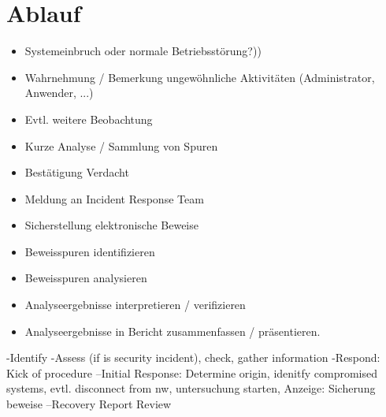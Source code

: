 \section{Ablauf}
\begin{itemize}
  \item Systemeinbruch oder normale Betriebsstörung?))
  \item Wahrnehmung / Bemerkung ungewöhnliche Aktivitäten (Administrator, Anwender, ...)
  \item Evtl. weitere Beobachtung
  \item Kurze Analyse / Sammlung von Spuren
  \item Bestätigung Verdacht
  \item Meldung an Incident Response Team
  \item Sicherstellung elektronische Beweise
  \item Beweisspuren identifizieren
  \item Beweisspuren analysieren
  \item Analyseergebnisse interpretieren / verifizieren
  \item Analyseergebnisse in Bericht zusammenfassen / präsentieren.
\end{itemize}

-Identify
-Assess (if is security incident), check, gather information
-Respond: Kick of procedure
--Initial Response: Determine origin, idenitfy compromised systems, evtl. disconnect from nw, untersuchung starten, Anzeige: Sicherung beweise
--Recovery
Report
Review
